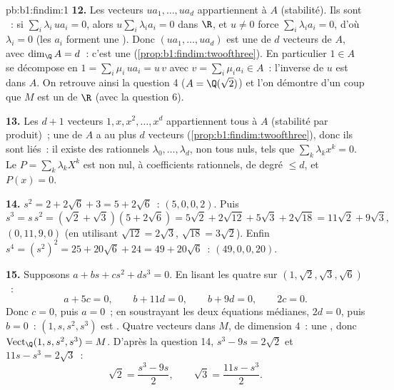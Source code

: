 \begin{solution}{pb:b1:findim:1}
\textbf{12.} Les vecteurs $u a_1, \dots, u a_d$ appartiennent à $A$
(stabilité). Ils sont ~: si $\sum_i \lambda_i\, u a_i = 0$,
alors $u \sum_i \lambda_i a_i = 0$ dans $\R$, et $u \neq 0$ force
$\sum_i \lambda_i a_i = 0$, d'où $\lambda_i = 0$ (les $a_i$ forment
une ). Donc $(u a_1, \dots, u a_d)$ est une  de $d$
vecteurs de $A$, avec $\dim_\Q A = d$~: c'est une 
(\cref{prop:b1:findim:twoofthree}). En particulier $1 \in A$ se
décompose en $1 = \sum_i \mu_i\, u a_i = u\,v$ avec $v = \sum_i
\mu_i a_i \in A$~: l'inverse de $u$ est dans $A$. On retrouve ainsi la
question 4 ($A = \Q(\sqrt2)$) et l'on démontre d'un coup que $M$
est un  de $\R$ (avec la question 6).

\textbf{13.} Les $d + 1$ vecteurs $1, x, x^2, \dots, x^{d}$
appartiennent tous à $A$ (stabilité par produit)~; une 
de $A$ a au plus $d$ vecteurs (\cref{prop:b1:findim:twoofthree}), donc
ils sont liés~: il existe des rationnels $\lambda_0, \dots,
\lambda_d$, non tous nuls, tels que $\sum_k \lambda_k x^k = 0$. Le
 $P = \sum_k \lambda_k X^k$ est non nul, à coefficients
rationnels, de degré $\leq d$, et $P(x) = 0$.

\textbf{14.} $s^2 = 2 + 2\sqrt6 + 3 = 5 + 2\sqrt6$~: 
$(5, 0, 0, 2)$. Puis
\[
s^3 = s\,s^2 = (\sqrt2 + \sqrt3)(5 + 2\sqrt6)
= 5\sqrt2 + 2\sqrt{12} + 5\sqrt3 + 2\sqrt{18}
= 11\sqrt2 + 9\sqrt3 ,
\]
 $(0, 11, 9, 0)$ (en utilisant $\sqrt{12} = 2\sqrt3$,
$\sqrt{18} = 3\sqrt2$). Enfin $s^4 = (s^2)^2 = 25 + 20\sqrt6 +
24 = 49 + 20\sqrt6$~:  $(49, 0, 0, 20)$.

\textbf{15.} Supposons $a + bs + cs^2 + ds^3 = 0$. En lisant les
quatre  sur $(1, \sqrt2, \sqrt3, \sqrt6)$~:
\[
a + 5c = 0,\qquad b + 11d = 0,\qquad b + 9d = 0,\qquad 2c = 0 .
\]
Donc $c = 0$, puis $a = 0$~; en soustrayant les deux équations
médianes, $2d = 0$, puis $b = 0$~: $(1, s, s^2, s^3)$ est .
Quatre vecteurs  dans $M$, de dimension $4$~: une , donc
$\operatorname{Vect}_\Q(1, s, s^2, s^3) = M$. D'après la question 14,
$s^3 - 9s = 2\sqrt2$ et $11s - s^3 = 2\sqrt3$~:
\[
\sqrt2 = \frac{s^3 - 9s}{2},
\qquad
\sqrt3 = \frac{11s - s^3}{2} .
\]


\end{solution}
